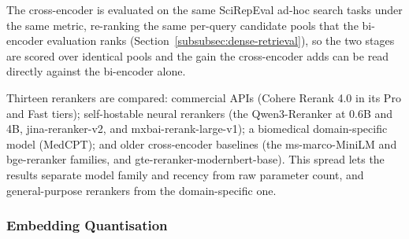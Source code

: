 The cross-encoder is evaluated on the same SciRepEval ad-hoc search tasks under the same metric, re-ranking the same per-query candidate pools that the bi-encoder evaluation ranks (Section~\ref{subsubsec:dense-retrieval}), so the two stages are scored over identical pools and the gain the cross-encoder adds can be read directly against the bi-encoder alone.

Thirteen rerankers are compared: commercial APIs (Cohere Rerank 4.0 in its Pro and Fast tiers); self-hostable neural rerankers (the Qwen3-Reranker at 0.6B and 4B, jina-reranker-v2, and mxbai-rerank-large-v1); a biomedical domain-specific model (MedCPT); and older cross-encoder baselines (the ms-marco-MiniLM and bge-reranker families, and gte-reranker-modernbert-base). This spread lets the results separate model family and recency from raw parameter count, and general-purpose rerankers from the domain-specific one.

\subsubsection{Embedding Quantisation}
\label{subsubsec:embedding-quantisation}

